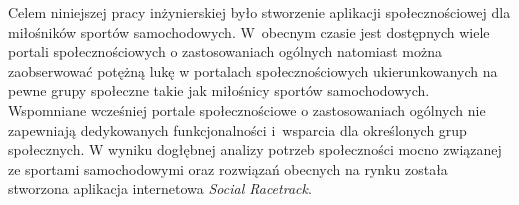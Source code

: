 \documentclass[../Kamil_Kowalewski_Main.tex]{subfiles}
\begin{document}
 {

    Celem niniejszej pracy inżynierskiej było stworzenie aplikacji społecznościowej
    dla miłośników sportów samochodowych. W~obecnym czasie jest dostępnych wiele
    portali społecznościowych o zastosowaniach ogólnych natomiast można zaobserwować
    potężną lukę w portalach społecznościowych ukierunkowanych na pewne grupy społeczne
    takie jak miłośnicy sportów samochodowych. Wspomniane wcześniej portale
    społecznościowe o zastosowaniach ogólnych nie zapewniają dedykowanych funkcjonalności
    i~wsparcia dla określonych grup społecznych. W wyniku dogłębnej analizy potrzeb
    społeczności mocno związanej ze sportami samochodowymi oraz rozwiązań obecnych na
    rynku została stworzona aplikacja internetowa \textit{Social Racetrack}.
}
\end{document}
